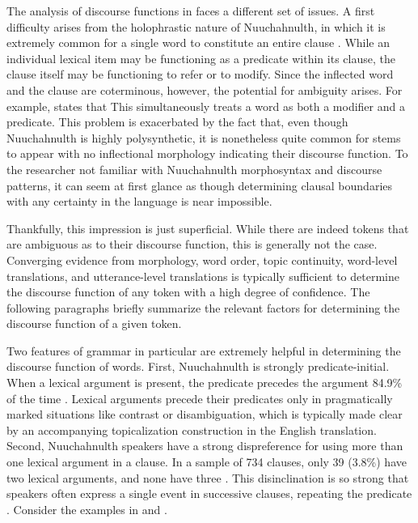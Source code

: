 The analysis of discourse functions in  faces a different set of issues. A first difficulty arises from the holophrastic nature of Nuuchahnulth, in which it is extremely common for a single word to constitute an entire clause . While an individual lexical item may be functioning as a predicate within its clause, the clause itself may be functioning to refer or to modify. Since the inflected word and the clause are coterminous, however, the potential for ambiguity arises. For example, \textcite[113]{Nakayama2001} states that  This simultaneously treats a word as both a modifier and a predicate. This problem is exacerbated by the fact that, even though Nuuchahnulth is highly polysynthetic, it is nonetheless quite common for stems to appear with no inflectional morphology indicating their discourse function. To the researcher not familiar with Nuuchahnulth morphosyntax and discourse patterns, it can seem at first glance as though determining clausal boundaries with any certainty in the language is near impossible.

Thankfully, this impression is just superficial. While there are indeed tokens that are ambiguous as to their discourse function, this is generally not the case. Converging evidence from morphology, word order, topic continuity, word-level translations, and utterance-level translations is typically sufficient to determine the discourse function of any token with a high degree of confidence. The following paragraphs briefly summarize the relevant factors for determining the discourse function of a given token.

Two features of  grammar in particular are extremely helpful in determining the discourse function of words. First, Nuuchahnulth is strongly predicate-initial. When a lexical argument is present, the predicate precedes the argument 84.9\% of the time \parencite[149]{Nakayama2001}. Lexical arguments precede their predicates only in pragmatically marked situations like contrast or disambiguation, which is typically made clear by an accompanying topicalization construction in the English translation. Second, Nuuchahnulth speakers have a strong dispreference for using more than one lexical argument in a clause. In a sample of 734 clauses, only 39 (3.8\%) have two lexical arguments, and none have three \parencite[149]{Nakayama2001}. This disinclination is so strong that speakers often express a single event in successive clauses, repeating the predicate \parencite[75]{Nakayama2001}. Consider the examples in  and .

